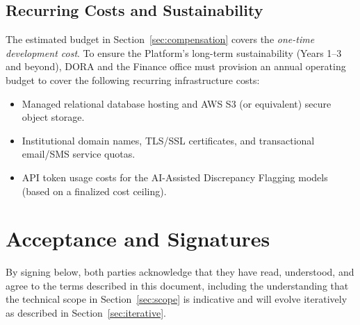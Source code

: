 \documentclass[11pt]{article}
\begin{document}
\subsection{Recurring Costs and Sustainability}
The estimated budget in Section~\ref{sec:compensation} covers the \textit{one-time development cost}. To ensure the Platform's long-term sustainability (Years 1--3 and beyond), DORA and the Finance office must provision an annual operating budget to cover the following recurring infrastructure costs:
\begin{itemize}[leftmargin=1.4em, itemsep=3pt]
\item Managed relational database hosting and AWS S3 (or equivalent) secure object storage.
\item Institutional domain names, TLS/SSL certificates, and transactional email/SMS service quotas.
\item API token usage costs for the AI-Assisted Discrepancy Flagging models (based on a finalized cost ceiling).
\end{itemize}

\section{Acceptance and Signatures}
By signing below, both parties acknowledge that they have read, understood, and agree to the terms described in this document, including the understanding that the technical scope in Section~\ref{sec:scope} is indicative and will evolve iteratively as described in Section~\ref{sec:iterative}.
\end{document}
